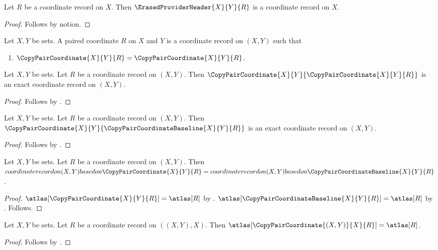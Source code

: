 



\begin{proposition}\label{erased_header_import}
    Let $R$ be a coordinate record on $X$.
    Then $\ErasedProviderHeader{X}{Y}{R}$ is a coordinate record on $X$.
\end{proposition}
\begin{proof}
    Follows by notion.
\end{proof}

\begin{struct}\label{paired_coordinate}
    Let $X,Y$ be sets.
    A paired coordinate $R$ on $X$ and $Y$ is a coordinate record on $(X,Y)$ such that
    \begin{enumerate}
        \item\label{paired_copy_reflexive}
            $\CopyPairCoordinate{X}{Y}{R}=\CopyPairCoordinate{X}{Y}{R}$.
    \end{enumerate}
\end{struct}

\begin{proposition}\label{copy_pair_import_shape}
    Let $X,Y$ be sets.
    Let $R$ be a coordinate record on $(X,Y)$.
    Then $\CopyPairCoordinate{X}{Y}{\CopyPairCoordinate{X}{Y}{R}}$
        is an exact coordinate record on $(X,Y)$.
\end{proposition}
\begin{proof}
    Follows by .
\end{proof}

\begin{proposition}\label{copy_pair_baseline_import_shape}
    Let $X,Y$ be sets.
    Let $R$ be a coordinate record on $(X,Y)$.
    Then $\CopyPairCoordinate{X}{Y}{\CopyPairCoordinateBaseline{X}{Y}{R}}$
        is an exact coordinate record on $(X,Y)$.
\end{proposition}
\begin{proof}
    Follows by .
\end{proof}

\begin{proposition}\label{copy_pair_import_reconstruction}
    Let $X,Y$ be sets.
    Let $R$ be a coordinate record on $(X,Y)$.
    Then $coordinate record on (X,Y) based on \CopyPairCoordinate{X}{Y}{R}
        =coordinate record on (X,Y) based on \CopyPairCoordinateBaseline{X}{Y}{R}$.
\end{proposition}
\begin{proof}
    $\atlas[\CopyPairCoordinate{X}{Y}{R}]=\atlas[R]$
        by .
    $\atlas[\CopyPairCoordinateBaseline{X}{Y}{R}]=\atlas[R]$
        by .
    Follows.
\end{proof}

\begin{proposition}\label{copy_nested_pair_import}
    Let $X,Y$ be sets.
    Let $R$ be a coordinate record on $((X,Y),X)$.
    Then $\atlas[\CopyPairCoordinate{(X,Y)}{X}{R}]=\atlas[R]$.
\end{proposition}
\begin{proof}
    Follows by .
\end{proof}
